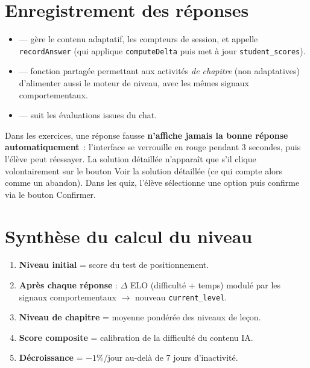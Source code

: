 \section{Enregistrement des réponses}
\begin{itemize}
  \item {} --- gère le contenu adaptatif,
        les compteurs de session, et appelle \texttt{recordAnswer} (qui applique
        \texttt{computeDelta} puis met à jour \texttt{student\_scores}).
  \item {} --- fonction partagée permettant
        aux activités \emph{de chapitre} (non adaptatives) d'alimenter aussi le
        moteur de niveau, avec les mêmes signaux comportementaux.
  \item {} --- suit les évaluations issues du chat.
\end{itemize}

\begin{notebox}
Dans les exercices, une réponse fausse \textbf{n'affiche jamais la bonne réponse
automatiquement}~: l'interface se verrouille en rouge pendant 3 secondes, puis
l'élève peut réessayer. La solution détaillée n'apparaît que s'il clique
volontairement sur le bouton \og Voir la solution détaillée\fg{} (ce qui compte alors
comme un abandon). Dans les quiz, l'élève sélectionne une option puis confirme
via le bouton \og Confirmer\fg{}.
\end{notebox}

\section{Synthèse du calcul du niveau}
\begin{enumerate}
  \item \textbf{Niveau initial} = score du test de positionnement.
  \item \textbf{Après chaque réponse} : $\Delta$ ELO (difficulté + temps) modulé
        par les signaux comportementaux $\rightarrow$ nouveau \texttt{current\_level}.
  \item \textbf{Niveau de chapitre} = moyenne pondérée des niveaux de leçon.
  \item \textbf{Score composite} = calibration de la difficulté du contenu IA.
  \item \textbf{Décroissance} = $-1\%$/jour au-delà de 7 jours d'inactivité.
\end{enumerate}
